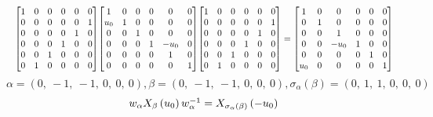 \documentclass[11pt]{article}
\theoremstyle{definition}
\begin{document}
\[
\scaletoalign{\textwidth}{{\left[\begin{matrix}1 & 0 & 0 & 0 & 0 & 0\\0 & 0 & 0 & 0 & 0 & 1\\0 & 0 & 0 & 0 & 1 & 0\\0 & 0 & 0 & 1 & 0 & 0\\0 & 0 & 1 & 0 & 0 & 0\\0 & 1 & 0 & 0 & 0 & 0\end{matrix}\right]} {\left[\begin{matrix}1 & 0 & 0 & 0 & 0 & 0\\u_{0} & 1 & 0 & 0 & 0 & 0\\0 & 0 & 1 & 0 & 0 & 0\\0 & 0 & 0 & 1 & - u_{0} & 0\\0 & 0 & 0 & 0 & 1 & 0\\0 & 0 & 0 & 0 & 0 & 1\end{matrix}\right]} {\left[\begin{matrix}1 & 0 & 0 & 0 & 0 & 0\\0 & 0 & 0 & 0 & 0 & 1\\0 & 0 & 0 & 0 & 1 & 0\\0 & 0 & 0 & 1 & 0 & 0\\0 & 0 & 1 & 0 & 0 & 0\\0 & 1 & 0 & 0 & 0 & 0\end{matrix}\right]} = {\left[\begin{matrix}1 & 0 & 0 & 0 & 0 & 0\\0 & 1 & 0 & 0 & 0 & 0\\0 & 0 & 1 & 0 & 0 & 0\\0 & 0 & - u_{0} & 1 & 0 & 0\\0 & 0 & 0 & 0 & 1 & 0\\u_{0} & 0 & 0 & 0 & 0 & 1\end{matrix}\right]}}
\]
\[
\alpha = \left( 0, \  -1, \  -1, \  0, \  0, \  0\right), \beta = \left( 0, \  -1, \  -1, \  0, \  0, \  0\right), \sigma_{\alpha}(\beta) = \left( 0, \  1, \  1, \  0, \  0, \  0\right)
\]
\[
\scaletoalign{\textwidth}{w_{\alpha} X_{\beta}\left(u_{0}\right) w_{\alpha}^{-1} = X_{\sigma_{\alpha}\left(\beta\right)}\left(- u_{0}\right)}
\]
\end{document}
